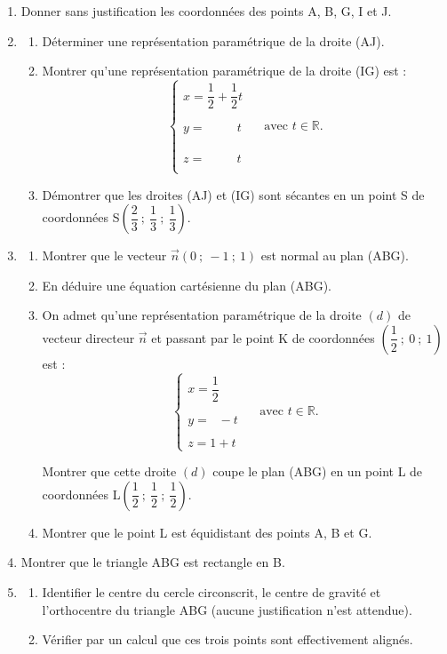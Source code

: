 \documentclass[10pt]{article}
\providecommand{\R}{\mathbb{R}}
\providecommand{\vect}[1]{\overrightarrow{#1}}
\begin{document}
	\begin{enumerate}
		\item Donner sans justification les coordonnées des points A, B, G, I et J.

		\item \begin{enumerate}
			\item Déterminer une représentation paramétrique de la droite (AJ).

			\item Montrer qu'une représentation paramétrique de la droite (IG) est : \[\left\{\begin{array}{l}x=\dfrac{1}{2}+\dfrac{1}{2} t \\ y=\phantom{\dfrac{1}{2}+\dfrac{1}{2}}t \\ z=\phantom{\dfrac{1}{2}+\dfrac{1}{2}}t\end{array} \right.\quad\text{ avec }t \in \R.\]

			\item Démontrer que les droites (AJ) et (IG) sont sécantes en un point S de coordonnées S$\left(\dfrac{2}{3} ~;~ \dfrac{1}{3} ~;~ \dfrac{1}{3}\right)$.
		\end{enumerate}

		\item \begin{enumerate}
			\item Montrer que le vecteur $\vect{n}(0 ~;~-1 ~;~ 1)$ est normal au plan (ABG).

			\item En déduire une équation cartésienne du plan (ABG).

			\item On admet qu'une représentation paramétrique de la droite $(d)$ de vecteur directeur $\vect{n}$ et passant par le point K de coordonnées $\left(\dfrac{1}{2} ~;~ 0 ~;~ 1\right)$ est : \[\left\{\begin{array}{l}
x=\dfrac{1}{2} \\
 y= \phantom{\dfrac{1}{2}}- t \\
  z=1+t\end{array} \right.\quad\text{ avec }t \in \R.\]

			Montrer que cette droite $(d)$ coupe le plan (ABG) en un point L de coordonnées L$\left(\dfrac{1}{2} ~;~ \dfrac{1}{2} ~;~ \dfrac{1}{2}\right)$.

			\item Montrer que le point L est équidistant des points A, B et G.
		\end{enumerate}

		\item Montrer que le triangle ABG est rectangle en B.

		\item \begin{enumerate}
			\item Identifier le centre du cercle circonscrit, le centre de gravité et l'orthocentre du triangle ABG (aucune justification n'est attendue).

			\item Vérifier par un calcul que ces trois points sont effectivement alignés.
		\end{enumerate}
	\end{enumerate}
\end{document}

